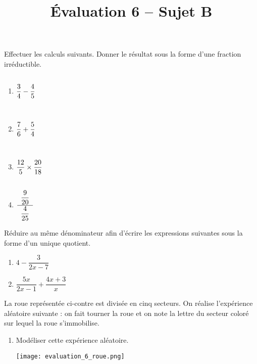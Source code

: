 \documentclass[a4paper,dvipsnames]{article}
\begin{document}
\title{Évaluation 6 -- Sujet B}
\author{}
\date{}

\maketitle{}

\pagestyle{empty}
\thispagestyle{empty}

\exo[3 points] Effectuer les calculs suivants. Donner le résultat sous la forme d'une fraction irréductible.
\begin{multicols}{4}
  \begin{enumerate}
    \item $\dfrac{3}{4} - \dfrac{4}{5}\vphantom{\dfrac{\dfrac{1}{2}}{\dfrac{3}{4}}}$\columnbreak
    \item $\dfrac{7}{6} + \dfrac{5}{4}\vphantom{\dfrac{\dfrac{1}{2}}{\dfrac{3}{4}}}$\columnbreak
    \item $\dfrac{12}{5} \times \dfrac{20}{18}\vphantom{\dfrac{\dfrac{1}{2}}{\dfrac{3}{4}}}$\columnbreak
    \item $\cfrac{\phantom{1}\dfrac{9}{20}\phantom{1}}{\dfrac{4}{25}}$
  \end{enumerate}
\end{multicols}
\dotfill{}

\bigskip

\exo[3 points] Réduire au même dénominateur afin d'écrire les expressions suivantes sous la forme d'un unique quotient.
\begin{multicols}{2}
  \begin{enumerate}
    \item $4-\dfrac{3}{2x-7}$
    \item $\dfrac{5x}{2x-1}+\dfrac{4x+3}{x}$
  \end{enumerate}
\end{multicols}
\dotfill{}

\pagebreak

\exo[3 points]\vspace*{-6mm}

\begin{multicols}{2}
  La roue représentée ci-contre est divisée en cinq secteurs. On réalise l'expérience aléatoire suivante : on fait tourner la roue et on note la lettre du secteur coloré sur lequel la roue s'immobilise.

  \begin{enumerate}
    \item Modéliser cette expérience aléatoire.
      \begin{center}
	\vspace*{1mm}\hspace*{7mm}\texttt{[image: evaluation\_6\_roue.png]}
      \end{center}
  \end{enumerate}
\end{multicols}
\end{document}
